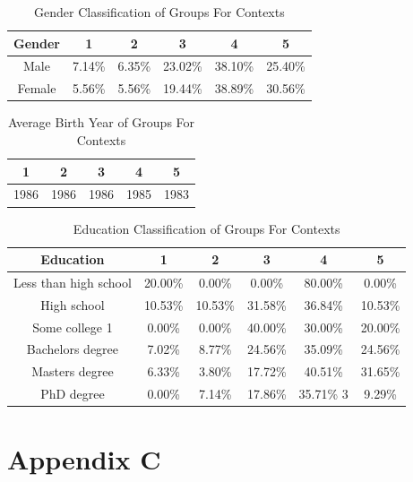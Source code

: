 \begin{table}[h!]
  \centering
  \caption{Gender Classification of Groups For Contexts}
  \label{tab:gender_c}
  \begin{tabular}{cccccc}
    \toprule
     Gender&1&2&3&4&5 \\
    \midrule
Male&	7.14\%	&6.35\%	&23.02\%	&38.10\%	&25.40\% \\
Female	&5.56\%	&5.56\%	&19.44\%	&38.89\%	&30.56\% \\
    \bottomrule
  \end{tabular}
\end{table}



\begin{table}[h!]
  \centering
  \caption{Average Birth Year of Groups For Contexts}
  \label{tab:year_c}
  \begin{tabular}{ccccc}
    \toprule
     1&2&3&4&5\\
    \midrule
	1986& 1986& 1986& 1985& 1983\\
    \bottomrule
  \end{tabular}
\end{table}


\begin{table}[h!]
  \centering
  \caption{Education Classification of Groups For Contexts}
  \label{tab:edu_c}
  \begin{tabular}{cccccc}
    \toprule
     Education&1&2&3&4&5\\
    \midrule
    
Less than high school	&20.00\%	&0.00\%	&0.00\%	&80.00\%	&0.00\%\\
High school	&10.53\%	&10.53\%	&31.58\%	&36.84\%	&10.53\%\\
Some college	1&0.00\%	&0.00\%	&40.00\%	&30.00\%	&20.00\%\\
Bachelors degree	&7.02\%	&8.77\%	&24.56\%	&35.09\%	&24.56\%\\
Masters degree	&6.33\%	&3.80\%	&17.72\%	&40.51\%	&31.65\%\\
PhD degree	&0.00\%	&7.14\%	&17.86\%	&35.71\%	3&9.29\%\\
    \bottomrule
  \end{tabular}
\end{table} 

\chapter{Appendix C}




